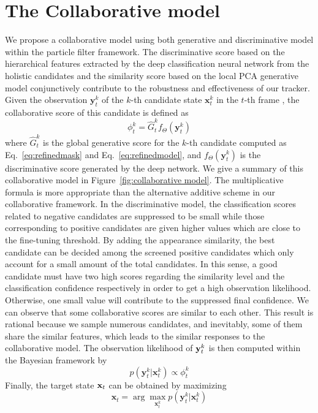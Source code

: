\documentclass[preprint,12pt,review]{elsarticle}
\begin{document}
\section{The Collaborative model}
We propose a collaborative model using both generative and discriminative model within the particle filter framework.
%
The discriminative score based on the hierarchical features extracted by the deep classification neural network from the holistic candidates and the similarity score based on the local PCA generative model conjunctively contribute to the robustness and effectiveness of our tracker.
%
Given the observation $\mathbf{y}_t^k$ of the $k$-th candidate state $\mathbf{x}_t^k$ in the $t$-th frame , the collaborative score of this candidate is defined as
\begin{equation}  \label{eq:collaborative model}
{\phi_t^k} = {\hat{G}_t^k}{f_{\Theta}(\mathbf{y}_t^k)}
\end{equation}
where $\hat{G}_t^k$ is the global generative score for the $k$-th candidate computed as Eq.~\ref{eq:refinedmask} and Eq.~\ref{eq:refinedmodel}, and $f_{\Theta}(\mathbf{y}_t^k)$ is the discriminative score generated by the deep network.
%
We give a summary of this collaborative model in Figure~\ref{fig:collaborative model}.
The multiplicative formula is more appropriate than the alternative additive scheme in our collaborative framework.
%
In the discriminative model, the classification scores related to negative candidates are suppressed to be small while those corresponding to positive candidates are given higher values which are close to the fine-tuning threshold.
%
%
By adding the appearance similarity, the best candidate can be decided among the screened positive candidates which only account for a small amount of the total candidates.
%
In this sense, a good candidate must have two high scores regarding the similarity level and the classification confidence respectively in order to get a high observation likelihood.
%
Otherwise, one small value will contribute to the suppressed final confidence.
%
We can observe that some collaborative scores are similar to each other.
%
This result is rational because we sample numerous candidates, and inevitably, some of them share the similar features, which leads to the similar responses to the collaborative model.
The observation likelihood of ${{\bf{y}}_t^k}$ is then computed within the Bayesian framework by
\begin{equation}
p({\mathbf{y}_t^k}|{\mathbf{x}_t^k}) \propto {\phi_t^k}
\end{equation}
%
Finally, the target state ${{\bf{x}}_t}$ can be obtained by maximizing
\begin{equation}{{\mathbf{x}}_t} = \arg \max_{\mathbf{x}_t^k} p({\mathbf{y}_t^k}|{\mathbf{x}_t^k})
\end{equation}
%
\end{document}
